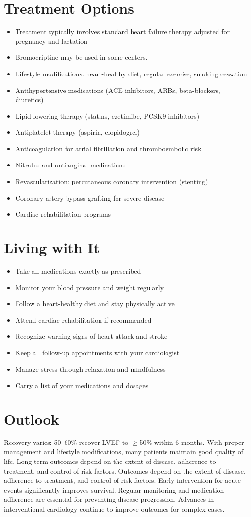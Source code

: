 \section{Treatment Options}
\begin{itemize}[noitemsep]
  \item Treatment typically involves standard heart failure therapy adjusted for pregnancy and lactation
  \item Bromocriptine may be used in some centers.
  \item Lifestyle modifications: heart-healthy diet, regular exercise, smoking cessation
  \item Antihypertensive medications (ACE inhibitors, ARBs, beta-blockers, diuretics)
  \item Lipid-lowering therapy (statins, ezetimibe, PCSK9 inhibitors)
  \item Antiplatelet therapy (aspirin, clopidogrel)
  \item Anticoagulation for atrial fibrillation and thromboembolic risk
  \item Nitrates and antianginal medications
  \item Revascularization: percutaneous coronary intervention (stenting)
  \item Coronary artery bypass grafting for severe disease
  \item Cardiac rehabilitation programs
\end{itemize}
\section{Living with It}
\begin{itemize}[noitemsep]
  \item Take all medications exactly as prescribed
  \item Monitor your blood pressure and weight regularly
  \item Follow a heart-healthy diet and stay physically active
  \item Attend cardiac rehabilitation if recommended
  \item Recognize warning signs of heart attack and stroke
  \item Keep all follow-up appointments with your cardiologist
  \item Manage stress through relaxation and mindfulness
  \item Carry a list of your medications and dosages
\end{itemize}
\section{Outlook}
Recovery varies: 50--60\% recover LVEF to $\ge$50\% within 6 months. With proper management and lifestyle modifications, many patients maintain good quality of life. Long-term outcomes depend on the extent of disease, adherence to treatment, and control of risk factors. Outcomes depend on the extent of disease, adherence to treatment, and control of risk factors. Early intervention for acute events significantly improves survival. Regular monitoring and medication adherence are essential for preventing disease progression. Advances in interventional cardiology continue to improve outcomes for complex cases.

